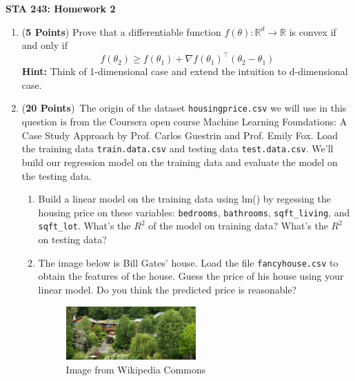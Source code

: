 \documentclass[12pt]{article}
\begin{document}
\small
\begin{center}
\large  \bf STA 243: Homework 2
\end{center}
\vspace{.31in}



\begin{enumerate}

\item (\textbf{5 Points}) Prove that a differentiable function $f(\theta): \mathbb{R}^d \to \mathbb{R}$ is convex if and only if $$
f(\theta_2) \geq f(\theta_1) + \nabla f(\theta_1)^\top (\theta_2 - \theta_1) 
$$
\textbf{Hint:} Think of 1-dimensional case and extend the intuition to d-dimensional case.

\item (\textbf{20 Points})~The origin of the dataset \texttt{housingprice.csv} we will use in this question is from the Coursera open course Machine Learning Foundations: A Case Study Approach by Prof. Carlos Guestrin and Prof. Emily Fox. Load the training data \texttt{train.data.csv} and testing data \texttt{test.data.csv}. We'll build our regression model on the training data and evaluate the model on the testing data.

\begin{enumerate}
\item Build a linear model on the training data using lm() by regessing the housing price on these variables: \texttt{bedrooms}, \texttt{bathrooms}, \texttt{sqft\_living}, and \texttt{sqft\_lot}. What's the $R^2$ of the model on training data? What's the $R^2$ on testing data?


\item The image below is Bill Gates' house. Load the file \texttt{fancyhouse.csv} to obtain the features of the house. Guess the price of his house using your linear model. Do you think the predicted price is reasonable?
\begin{figure}[!htbp]
\centering
\includegraphics[width = 0.5\textwidth]{./Bill_gates_house.jpg}
\caption{Image from Wikipedia Commons}
\end{figure}


\end{enumerate}
\end{enumerate}
\end{document}
